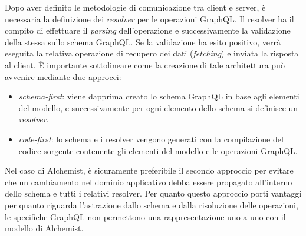 Dopo aver definito le metodologie di comunicazione tra client e server, è necessaria la definizione dei \textit{resolver} per le operazioni GraphQL.
Il resolver ha il compito di effettuare il \textit{parsing} dell'operazione e successivamente la validazione della stessa sullo schema GraphQL.
Se la validazione ha esito positivo, verrà eseguita la relativa operazione di recupero dei dati (\textit{fetching}) e inviata la risposta al client.
È importante sottolineare come la creazione di tale architettura può avvenire mediante due approcci:
\begin{itemize}
    \item \textit{schema-first}: viene dapprima creato lo schema GraphQL in base agli elementi del modello, e successivamente per ogni elemento dello schema
        si definisce un \textit{resolver}.
    \item \textit{code-first}: lo schema e i resolver vengono generati con la compilazione del codice sorgente contenente gli elementi del modello
        e le operazioni GraphQL.
\end{itemize}
Nel caso di Alchemist, è sicuramente preferibile il secondo approccio per evitare che un cambiamento nel dominio applicativo debba essere propagato
all'interno dello schema e tutti i relativi resolver.
Per quanto questo approccio porti vantaggi per quanto riguarda l'astrazione dallo schema e dalla risoluzione delle operazioni, le specifiche GraphQL
non permettono una rappresentazione uno a uno con il modello di Alchemist.


